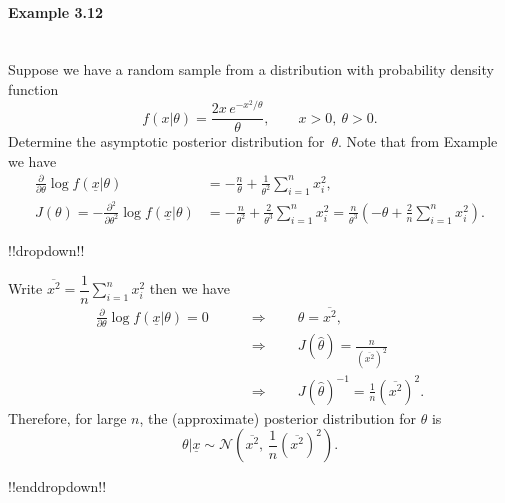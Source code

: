 \paragraph{Example 3.12}{~\\
Suppose we have a random sample from a distribution with probability density function
\begin{equation*}
f(x|\theta)=\frac{2x\,e^{-x^2/\theta}}{\theta},\quad\quad x>0,~\theta>0.
\end{equation*}
Determine the asymptotic posterior distribution for~$\theta$. Note that from Example~ we have 
\begin{align*}
\frac{\partial}{\partial\theta} \log
f(\underline{x}|\theta)&=-\frac{n}{\theta}+\frac{1}{\theta^2}\sum_{i=1}^n
x_i^2, \\
J(\theta)=-\frac{\partial^2}{\partial\theta^2} \log
f(\underline{x}|\theta)&=-\frac{n}{\theta^2} +\frac{2}{\theta^3}\sum_{i=1}^n
x_i^2 =\frac{n}{\theta^3}\left(-\theta+\frac{2}{n}\sum_{i=1}^n
x_i^2\right).
\end{align*}

!!dropdown!!

Write $\overline{x^2}=\dfrac{1}{n}\displaystyle\sum_{i=1}^n x_i^2$ then we have
    \begin{align*}
    \frac{\partial}{\partial\theta} \log f(\underline{x}|\theta)=0
    \quad\quad&\Longrightarrow\quad\quad
    \hat\theta=\overline{x^2}, \\
    &\Longrightarrow\quad\quad
    J(\hat\theta)=\frac{n}{\left(\overline{x^2}\right)^2} \\
    &\Longrightarrow\quad\quad
    J(\hat\theta)^{-1}=\frac{1}{n}\left(\overline{x^2}\right)^2.
    \end{align*}
    Therefore, for large $n$, the (approximate) posterior distribution for
    $\theta$ is
    $$
    \theta|\underline{x}\sim \mathcal{N}\left(\overline{x^2},\,
    \frac{1}{n}\left(\overline{x^2}\right)^2\right).
    $$

!!enddropdown!!}



